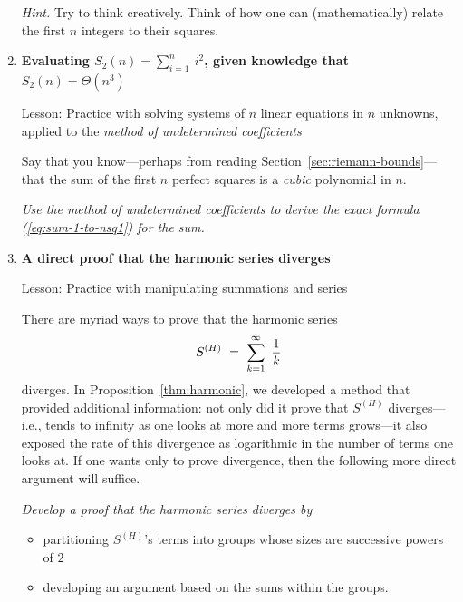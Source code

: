 \begin{enumerate}
\smallskip

{\em Hint.}
Try to think creatively.  Think of how one can (mathematically) relate the first $n$ integers to their squares.

\item
{\bf Evaluating $S_2(n) = \sum_{i=1}^n \ i^2$, given knowledge that $S_2(n) = \Theta(n^3)$}

{\sc Lesson:} Practice with solving systems of $n$ linear equations in $n$ unknowns, applied to the {\it method of undetermined coefficients}


\smallskip

Say that you know---perhaps from reading Section~\ref{sec:riemann-bounds}---that the sum of the first $n$ perfect squares is a {\em cubic} polynomial in $n$.

\smallskip

{\em Use the method of undetermined coefficients to derive the exact formula (\ref{eq:sum-1-to-nsq1}) for the sum.}

\item
{\bf A direct proof that the harmonic series diverges}

{\sc Lesson:}
Practice with manipulating summations and series

\smallskip

There are myriad ways to prove that the harmonic series
\[ S^{(H)} \ = \ \sum_{k=1}^\infty \ {1 \over k} \]
diverges.  In Proposition~\ref{thm:harmonic}, we developed a method that provided additional information: not only did it prove that $S^{(H)}$ diverges---i.e., tends to infinity as one looks at more and more terms grows---it also exposed the rate of this divergence as logarithmic in the number of terms one looks at.  If one wants only to prove divergence, then the following more direct argument will suffice.

\medskip

{\em Develop a proof that the harmonic series diverges by
\begin{itemize}
\item
partitioning $S^{(H)}$'s terms into groups whose sizes are successive powers of $2$
\item
developing an argument based on the sums within the groups.
\end{itemize}
}

\smallskip


\end{enumerate}
